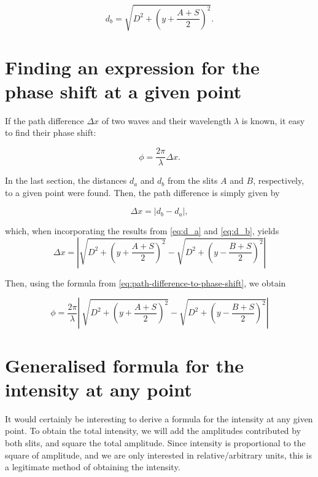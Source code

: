 \documentclass{paper}
\newcommand{\daformula}[0]{\sqrt{D^2 + \left(y - \frac{B + S}{2}\right)^2}}
\newcommand{\dbformula}[0]{\sqrt{D^2 + \left(y + \frac{A + S}{2}\right)^2}}
\begin{document}
\begin{equation}
    \label{eq:d_b}
    d_b = \dbformula.
\end{equation}
            
\section{Finding an expression for the phase shift at a given point}

If the path difference $\Delta{x}$ of two waves and their wavelength $\lambda$ is known, it easy to find their
phase shift:
            
\begin{equation*}
    \phi = \frac{2\pi}{\lambda}\Delta{x}.
\end{equation*}
            
In the last section, the distances $d_a$ and $d_b$ from the slits $A$ and $B$, respectively,
to a given point were found. Then, the path difference is simply given by
            
\begin{equation*}
    \Delta{x} = \lvert{}d_b - d_a\rvert{},
\end{equation*}
            
which, when incorporating the results from \eqref{eq:d_a} and \eqref{eq:d_b}, yields
\begin{equation*}
    \Delta{x} = \left\lvert \dbformula - \daformula \right\rvert
\end{equation*}
            
Then, using the formula from \eqref{eq:path-difference-to-phase-shift}, we obtain
            
\begin{equation}
    \label{eq:phase-shift}
    \phi = \frac{2\pi}{\lambda}\left\lvert\ \dbformula - \daformula \right\rvert
\end{equation}
            
\section{Generalised formula for the intensity at any point}
\label{section:intensity-formula}

It would certainly be interesting to derive a formula for the intensity at any given point.
To obtain the total intensity, we will add the amplitudes contributed by
both slits, and square the total amplitude. Since intensity is proportional to the
square of amplitude, and we are only interested in relative/arbitrary units, this is a
legitimate method of obtaining the intensity.
            
\end{document}

